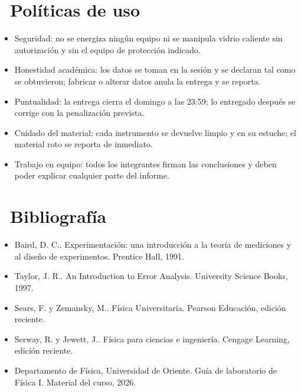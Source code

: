 \documentclass[11pt,a4paper]{article}
\newcommand{\iconotexto}[2]{\textcolor{cyanNeon}{\faIcon{#1}}~#2}
\begin{document}
\section{\iconotexto{balance-scale}{Políticas de uso}}

\begin{itemize}[leftmargin=1.4em,itemsep=2pt,topsep=3pt]
  \item Seguridad: no se energiza ningún equipo ni se manipula vidrio caliente sin autorización y sin el equipo de protección indicado.
  \item Honestidad académica: los datos se toman en la sesión y se declaran tal como se obtuvieron; fabricar o alterar datos anula la entrega y se reporta.
  \item Puntualidad: la entrega cierra el domingo a las 23:59; lo entregado después se corrige con la penalización prevista.
  \item Cuidado del material: cada instrumento se devuelve limpio y en su estuche; el material roto se reporta de inmediato.
  \item Trabajo en equipo: todos los integrantes firman las conclusiones y deben poder explicar cualquier parte del informe.
\end{itemize}

\section{\iconotexto{book}{Bibliografía}}

\begin{itemize}[leftmargin=1.4em,itemsep=2pt,topsep=3pt]
  \item Baird, D. C.. Experimentación: una introducción a la teoría de mediciones y al diseño de experimentos. Prentice Hall, 1991.
  \item Taylor, J. R.. An Introduction to Error Analysis. University Science Books, 1997.
  \item Sears, F. y Zemansky, M.. Física Universitaria. Pearson Educación, edición reciente.
  \item Serway, R. y Jewett, J.. Física para ciencias e ingeniería. Cengage Learning, edición reciente.
  \item Departamento de Física, Universidad de Oriente. Guía de laboratorio de Física I. Material del curso, 2026.
\end{itemize}
\end{document}
